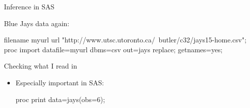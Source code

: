 \documentclass[unknownkeysallowed]{beamer}\usepackage[]{graphicx}\usepackage[]{color}
\begin{document}
\begin{frame}[fragile]{Inference in SAS}
  
  Blue Jays data again:
  
  \begin{Datastep}
filename myurl url 
  "http://www.utsc.utoronto.ca/~butler/c32/jays15-home.csv";
proc import
  datafile=myurl
    dbms=csv
    out=jays
    replace;
  getnames=yes;
  \end{Datastep}
  
\end{frame}

\begin{frame}[fragile]{Checking what I read in}
  
  \begin{itemize}
  \item Especially important in SAS:
    
    \begin{Sascode}[store=iza]
proc print data=jays(obs=6);      
    \end{Sascode}
    
  \end{itemize}
  
\end{frame}
\end{document}
